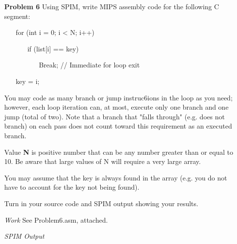 \documentclass[12pt]{article}
\begin{document}
\begin{enumerate}
  \item[\textbf{Problem 6}] Using SPIM, write MIPS assembly code for the following C segment:
  \begin{enumerate}\ttfamily
    \item[] for (int i = 0; i < N; i++)
    \begin{enumerate}
      \item[] if (list[i] == key)
      \begin{enumerate}
        \item[] Break; // Immediate for loop exit
      \end{enumerate}
    \end{enumerate}
    \item[] key = i;
  \end{enumerate}

  \item[] You may code as many branch or jump instruc6ions in the loop as you need; however, each loop iteration can, at most, execute only one branch and one jump (total of two). Note that a branch that "falls through" (e.g. does not branch) on each pass does not count toward this requirement as an executed branch.

  \item[] Value \textbf{N} is positive number that can be any number greater than or equal to 10. Be aware that large values of N will require a very large array.

  \item[] You may assume that the key is always found in the array (e.g. you do not have to account for the key not being found).

	\item[] Turn in your source code and SPIM output showing your results.
\end{enumerate}

\begin{enumerate}
  \item[\textit{Work}] See Problem6.asm, attached.
  \item[\textit{SPIM Output}]
\end{enumerate}
\end{document}
